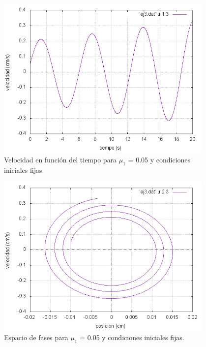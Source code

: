\documentclass[a4paper,12pt]{article}
\begin{document}
\begin{itemize}
\begin{figure}[H]
\begin{center}
\includegraphics[height=8cm]{grafico_ej3_vVSt.jpg}
\caption[width=5cm]{Velocidad en funci\'on del tiempo para $\mu_1$ = 0.05 y condiciones iniciales fijas.}
\end{center}
\end{figure}

\begin{figure}[H]
\begin{center}
\includegraphics[height=8cm]{grafico_ej3_xVSv.jpg}
\caption[width=5cm]{Espacio de fases para $\mu_1$ = 0.05 y condiciones iniciales fijas.}
\end{center}
\end{figure}


\end{itemize}
\end{document}
